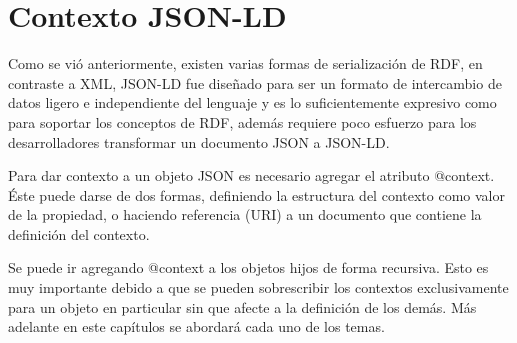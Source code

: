 \section{Contexto JSON-LD}

Como se vió anteriormente, existen varias formas de serialización de RDF, en contraste a XML, JSON-LD fue diseñado para ser un formato de intercambio de datos ligero e independiente del lenguaje y es lo suficientemente expresivo como para soportar los conceptos de RDF, además requiere poco esfuerzo para los desarrolladores transformar un documento JSON a JSON-LD. 

Para dar contexto a un objeto JSON es necesario agregar el atributo @context. Éste puede darse de dos formas, definiendo la estructura del contexto como valor de la propiedad, o haciendo referencia (URI) a un documento que contiene la definición del contexto.

Se puede ir agregando @context a los objetos hijos de forma recursiva. Esto es muy importante debido a que se pueden sobrescribir los contextos exclusivamente para un objeto en particular sin que afecte a la definición de los demás. Más adelante en este capítulos se abordará cada uno de los temas.



 